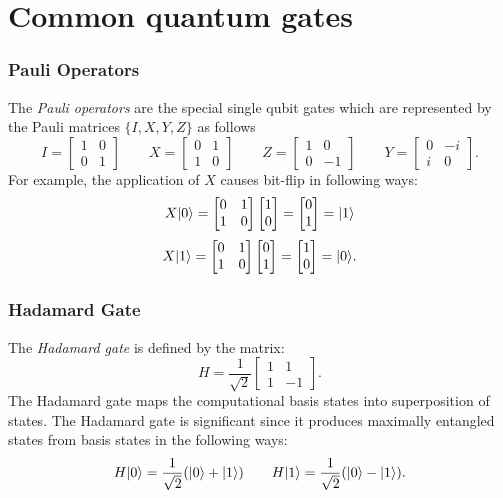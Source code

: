 \section {Common quantum gates}

\subsubsection*{Pauli Operators}
	The \emph{Pauli operators} are the special single qubit gates which are represented by the Pauli matrices $\{I, X, Y, Z\}$ as follows
	\[
I =
\begin{bmatrix}
 1 & 0  \\
 0 & 1  
\end{bmatrix}
\qquad
X =
\begin{bmatrix}
 0 & 1  \\
 1 & 0  
\end{bmatrix}
\qquad
Z =
\begin{bmatrix}
 1 & 0  \\
 0 & -1  
\end{bmatrix}
\qquad
Y =
\begin{bmatrix}
 0 & -i  \\
 i & 0  
\end{bmatrix}.
\]
For example, the application of $X$ causes bit-flip in following ways:
\[
X|0\rangle=\begin{bmatrix}
 0 & 1  \\
 1 & 0  
\end{bmatrix}
\begin{bmatrix}
 1   \\
 0   
\end{bmatrix}=\begin{bmatrix}
 0   \\
 1   
\end{bmatrix}= |1\rangle
\]
\[
X|1\rangle=\begin{bmatrix}
 0 & 1  \\
 1 & 0  
\end{bmatrix}
\begin{bmatrix}
 0   \\
 1   
\end{bmatrix}=\begin{bmatrix}
 1   \\
 0   
\end{bmatrix}= |0\rangle.
\]
\subsubsection*{Hadamard Gate}
The \emph{Hadamard gate} is defined by the matrix:
\[
H= \frac{1}{\sqrt{2}}\begin{bmatrix}
 1 & 1  \\
 1 & -1
\end{bmatrix}.
\]
The Hadamard gate maps the computational basis states into superposition of states. The Hadamard gate is significant since it produces maximally entangled states from basis states in the following ways:
\[
H|0\rangle=\frac{1}{\sqrt{2}}(|0\rangle+|1\rangle)
\qquad
H|1\rangle=\frac{1}{\sqrt{2}}(|0\rangle-|1\rangle).
\]

